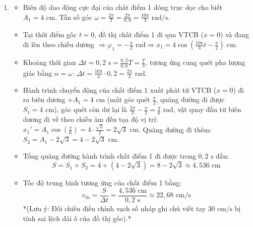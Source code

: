 \begin{ex}
{\begin{enumerate}
\begin{itemize}
				\item Chu kì $T = 0,6\text{ s}$ ứng với 6 ô lưới hình học trục ngang $\Rightarrow 1\text{ ô} = 0,1\text{ s}$, tương ứng góc quét pha bằng $\frac{2\pi}{6} = \frac{\pi}{3}\text{ rad}$.
				\item Quan sát vạch mốc đỉnh: Đỉnh cực đại của đồ thị chất điểm 1 đi sau đỉnh cực đại của chất điểm 2 một khoảng hành trình nằm ngang đúng bằng 1 ô lưới hình học.
				\item Do đó, độ lệch pha giữa hai chất điểm dao động điều hòa bằng: $\Delta \varphi = 1 \cdot \frac{\pi}{3} = \frac{\pi}{3}\text{ rad}$.
			\end{itemize}
			\item[c)] 
			\begin{itemize}
				\item Biên độ dao động cực đại của chất điểm 1 dóng trục dọc cho biết $A_1 = 4\text{ cm}$. Tần số góc $\omega = \frac{2\pi}{T} = \frac{2\pi}{0,6} = \frac{10\pi}{3}\text{ rad/s}$.
				\item Tại thời điểm gốc $t=0$, đồ thị chất điểm 1 đi qua VTCB ($x=0$) và đang đi lên theo chiều dương $\Rightarrow \varphi_1 = -\frac{\pi}{2}\text{ rad} \Rightarrow x_1 = 4\cos\left(\frac{10\pi}{3}t - \frac{\pi}{2}\right)\text{ cm}$.
				\item Khoảng thời gian $\Delta t = 0,2\text{ s} = \frac{0,2}{0,6}T = \frac{T}{3}$, tương ứng cung quét pha lượng giác bằng $\alpha = \omega \cdot \Delta t = \frac{10\pi}{3} \cdot 0,2 = \frac{2\pi}{3}\text{ rad}$.
				\item Hành trình chuyển động của chất điểm 1 xuất phát từ VTCB ($x=0$) đi ra biên dương $+A_1 = 4\text{ cm}$ (mất góc quét $\frac{\pi}{2}$, quãng đường đi được $S_1 = 4\text{ cm}$), góc quét còn dư lại là $\frac{2\pi}{3} - \frac{\pi}{2} = \frac{\pi}{6}\text{ rad}$, vật quay đầu từ biên dương đi về theo chiều âm đến tọa độ vị trí: $x_1' = A_1\cos\left(\frac{\pi}{6}\right) = 4 \cdot \frac{\sqrt{3}}{2} = 2\sqrt{3}\text{ cm}$. Quãng đường đi thêm: $S_2 = A_1 - 2\sqrt{3} = 4 - 2\sqrt{3}\text{ cm}$.
				\item Tổng quãng đường hành trình chất điểm 1 đi được trong $0,2\text{ s}$ đầu: 
				$$S = S_1 + S_2 = 4 + (4 - 2\sqrt{3}) = 8 - 2\sqrt{3} \approx 4,536\text{ cm} \text{}$$
				\item Tốc độ trung bình tương ứng của chất điểm 1 bằng:
				$$v_{\text{tb}} = \frac{S}{\Delta t} = \frac{4,536\text{ cm}}{0,2\text{ s}} \approx 22,68\text{ cm/s} \text{}$$
				*(Lưu ý: Đối chiếu điều chỉnh vạch số nháp ghi chú viết tay $30\text{ cm/s}$ bị tính sai lệch dải ô của đồ thị gốc).*
			\end{itemize}
		\end{enumerate}
	}
	\nobreak
\end{ex}

